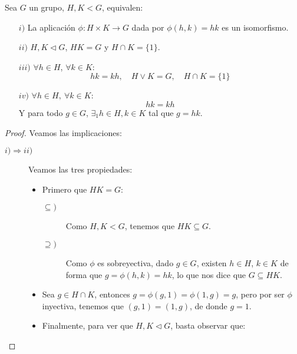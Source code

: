 \begin{teo}\label{teo:carac_prod_interno}
    Sea $G$ un grupo, $H,K<G$, equivalen:
    \begin{enumerate}
        \item[$i)$] La aplicación $\phi:H\times K\to G$ dada por $\phi(h,k) = hk$ es un isomorfismo.
        \item[$ii)$] $H,K\lhd G$, $HK = G$ y $H\cap K = \{1\}$.
        \item[$iii)$] $\forall h\in H$, $\forall k\in K$:
            \begin{equation*}
                hk = kh, \quad H\lor K = G,\quad H\cap K = \{1\}
            \end{equation*}
        \item[$iv)$] $\forall h\in H,\ \forall k\in K$:
            \begin{equation*}
                hk = kh
            \end{equation*}
            Y para todo $g\in G$, $\exists_1h\in H, k\in K$ tal que $g = hk$.
    \end{enumerate}
    \begin{proof}
        Veamos las implicaciones:
        \begin{description}
            \item [$i)\Longrightarrow ii)$] Veamos las tres propiedades:
                \begin{itemize}
                    \item Primero que $HK = G$:
                        \begin{description}
                            \item [$\subseteq)$] Como $H,K<G$, tenemos que $HK\subseteq G$.
                            \item [$\supseteq)$] Como $\phi$ es sobreyectiva, dado $g\in G$, existen $h\in H$, $k\in K$ de forma que $g = \phi(h,k) = hk$, lo que nos dice que $G \subseteq  HK$. 
                        \end{description}
                    \item Sea $g\in H\cap K$, entonces $g = \phi(g,1) = \phi(1,g) = g$, pero por ser $\phi$ inyectiva, tenemos que $(g,1)=(1,g)$, de donde $g = 1$.
                    \item Finalmente, para ver que $H,K\lhd G$, basta observar que:
                        \begin{figure}[H]
                            \centering

\end{figure}
\end{itemize}
\end{description}
\end{proof}
\end{teo}
